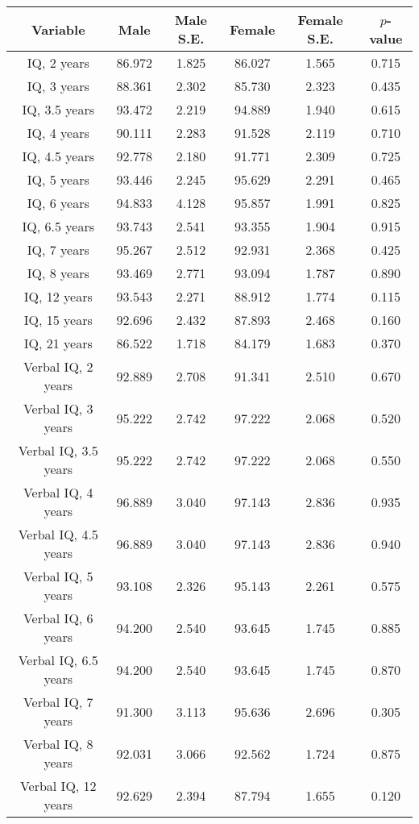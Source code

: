 \begin{longtable}{c c c c c c}
\toprule
\textbf{Variable} & \textbf{Male} & \textbf{Male S.E.}  & \textbf{Female} & \textbf{Female S.E.} & \textbf{$ p $-value} \\
\midrule
IQ, 2 years & 86.972 & 1.825 &  86.027 & 1.565 & 0.715 \\
IQ, 3 years & 88.361 & 2.302 &  85.730 & 2.323 & 0.435 \\
IQ, 3.5 years & 93.472 & 2.219 &  94.889 & 1.940 & 0.615 \\
IQ, 4 years & 90.111 & 2.283 &  91.528 & 2.119 & 0.710 \\
IQ, 4.5 years & 92.778 & 2.180 &  91.771 & 2.309 & 0.725 \\
IQ, 5 years & 93.446 & 2.245 &  95.629 & 2.291 & 0.465 \\
IQ, 6 years & 94.833 & 4.128 &  95.857 & 1.991 & 0.825 \\
IQ, 6.5 years & 93.743 & 2.541 &  93.355 & 1.904 & 0.915 \\
IQ, 7 years & 95.267 & 2.512 &  92.931 & 2.368 & 0.425 \\
IQ, 8 years & 93.469 & 2.771 &  93.094 & 1.787 & 0.890 \\
IQ, 12 years & 93.543 & 2.271 &  88.912 & 1.774 & 0.115 \\
IQ, 15 years & 92.696 & 2.432 &  87.893 & 2.468 & 0.160 \\
IQ, 21 years & 86.522 & 1.718 &  84.179 & 1.683 & 0.370 \\
Verbal IQ, 2 years & 92.889 & 2.708 &  91.341 & 2.510 & 0.670 \\
Verbal IQ, 3 years & 95.222 & 2.742 &  97.222 & 2.068 & 0.520 \\
Verbal IQ, 3.5 years & 95.222 & 2.742 &  97.222 & 2.068 & 0.550 \\
Verbal IQ, 4 years & 96.889 & 3.040 &  97.143 & 2.836 & 0.935 \\
Verbal IQ, 4.5 years & 96.889 & 3.040 &  97.143 & 2.836 & 0.940 \\
Verbal IQ, 5 years & 93.108 & 2.326 &  95.143 & 2.261 & 0.575 \\
Verbal IQ, 6 years & 94.200 & 2.540 &  93.645 & 1.745 & 0.885 \\
Verbal IQ, 6.5 years & 94.200 & 2.540 &  93.645 & 1.745 & 0.870 \\
Verbal IQ, 7 years & 91.300 & 3.113 &  95.636 & 2.696 & 0.305 \\
Verbal IQ, 8 years & 92.031 & 3.066 &  92.562 & 1.724 & 0.875 \\
Verbal IQ, 12 years & 92.629 & 2.394 &  87.794 & 1.655 & 0.120 \\

\end{longtable}
